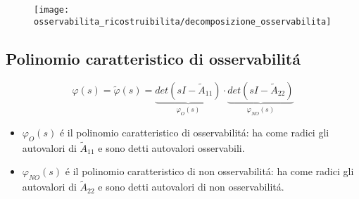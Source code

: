 \documentclass[../main.tex]{subfiles}
\begin{document}
		\begin{figure}[H]
			\centering\texttt{[image: osservabilita\_ricostruibilita/decomposizione\_osservabilita]}
		\end{figure}
		
	\subsection{Polinomio caratteristico di osservabilit\'a}
		\[
			\varphi(s) = \tilde{\varphi}(s) = \underbrace{det(sI- \tilde A_{11})}_{\varphi_O(s)} \cdot \underbrace{det(sI- \tilde A_{22})}_{\varphi_{NO}(s)}
		\]
		\begin{itemize}
			\item 
				$ \varphi_O(s) $ \'e il polinomio caratteristico di osservabilit\'a: ha come radici gli autovalori di $ \tilde A_{11} $ e sono detti autovalori osservabili.
			\item 
				$ \varphi_{NO}(s) $ \'e il polinomio caratteristico di non osservabilit\'a: ha come radici gli autovalori di $ \tilde A_{22} $ e sono detti autovalori di non osservabilit\'a.
		\end{itemize}
	
\end{document}

